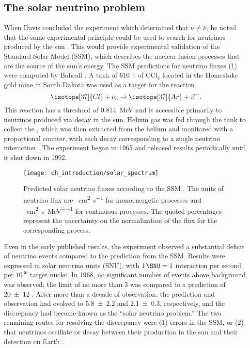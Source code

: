 \subsection{The solar neutrino problem}
\label{subsec:homestake}

When Davis concluded the experiment which determined that $\nu\neq\bar{\nu}$,
he noted that the same experimental principle could be used
to search for neutrinos produced by the sun \cite{davis_diff_nuebar}.
This would provide experimental validation of the Standard Solar Model (SSM),
which describes the nuclear fusion processes
that are the source of the sun's energy.
The SSM predictions for neutrino fluxes (\cref{fig:solarflux})
were computed by Bahcall \cite{bahcall2004}.
A tank of \SI{610}{\tonne} of $\text{CCl}_4$
located in the Homestake gold mine in South Dakota
was used as a target for the reaction
\begin{equation}\label{eq:davis_nu}
    \isotope[37]{Cl} + \nu_e \to \isotope[37]{Ar} + \beta^-.
\end{equation}
This reaction has a threshold of \SI{0.814}{\MeV} \cite{solar_review}
and is accessible primarily to neutrinos
produced via  decay in the sun.
Helium gas was fed through the tank
to collect the ,
which was then extracted from the helium
and monitored with a proportional counter,
with each decay corresponding to a single neutrino interaction \cite{homestake1968}.
The experiment began in 1965 and released results periodically
until it shut down in 1992.

\begin{figure}
    \centering
    \texttt{[image: ch\_introduction/solar\_spectrum]}
    \caption[SSM solar neutrino fluxes]{
        Predicted solar neutrino fluxes according to the SSM \cite{bahcall2004}.
        The units of neutrino flux are
        \si[per-mode=reciprocal]{\per\square\cm\per\second} for monoenergetic processes
        and \si[per-mode=reciprocal]{\per\square\cm\per\second\per\MeV}
        for continuous processes.
        The quoted percentages represent the uncertainty
        on the normalization of the flux for the corresponding process.
    }
    \label{fig:solarflux}
\end{figure}

Even in the early published results,
the experiment observed a substantial deficit of neutrino events
compared to the prediction from the SSM.
Results were expressed in solar neutrino units (SNU),
with $\SI{1}{\SNU} = 1$ interaction per second per $10^{36}$ target nuclei.
In 1968, no significant number of events above background was observed;
the limit of no more than \SI{3}{\SNU} was compared to a prediction of
\SI{20\pm12}{\SNU} \cite{homestake1968}.
After more than a decade of observation,
the prediction and observation had evolved to \SI{5.8\pm2.2}{\SNU}
and \SI{2.1\pm0.3}{\SNU}, respectively,
and the discrepancy had become known as the ``solar neutrino problem.''
The two remaining routes for resolving the discrepancy were
(1) errors in the SSM, or (2) that neutrinos oscillate or decay
between their production in the sun and their detection on Earth \cite{davis1985}.

